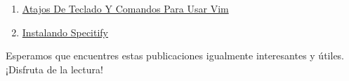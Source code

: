 \documentclass[
  doc,
  floatsintext,
  longtable,
  a4paper,
  nolmodern,
  notxfonts,
  notimes,
  colorlinks=true,linkcolor=blue,citecolor=blue,urlcolor=blue]{apa7}
\begin{document}
\begin{enumerate}
{  Administracion Particiones Volumenes}
\item
  \href{https://achalmaedison.netlify.app/tecnologia-seguridad/operating-system/2023-07-01-atajos-de-teclado-y-comandos-para-usar-vim/index.pdf}{}
  \href{https://achalmaedison.netlify.app/tecnologia-seguridad/operating-system/2023-07-01-atajos-de-teclado-y-comandos-para-usar-vim}{Atajos
  De Teclado Y Comandos Para Usar Vim}
\item
  \href{https://achalmaedison.netlify.app/tecnologia-seguridad/operating-system/2024-07-15-instalando-specitify/index.pdf}{}
  \href{https://achalmaedison.netlify.app/tecnologia-seguridad/operating-system/2024-07-15-instalando-specitify}{Instalando
  Specitify}
\end{enumerate}

Esperamos que encuentres estas publicaciones igualmente interesantes y
útiles. ¡Disfruta de la lectura!
\end{document}
